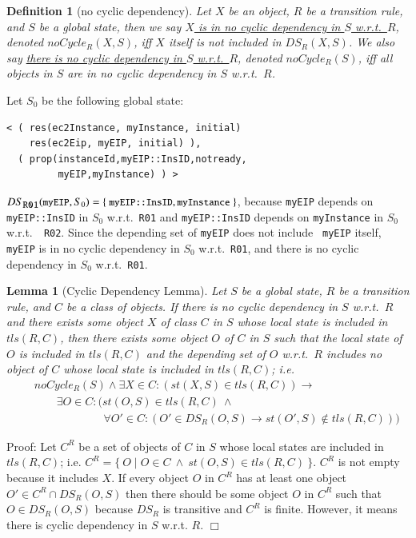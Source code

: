 \documentclass[12pt]{report}
\newtheorem{lemma}{Lemma}
\newtheorem{definition}{Definition}
\newcommand{\ra}{\rightarrow}
\newcommand{\mbstt}[1]{\mbox{\small{\tt {#1}}}}
\newcommand{\stt}[1]{{\small{\tt {#1}}}}
\newcommand{\ul}{\underline}
\begin{document}
\begin{definition}[no cyclic dependency]
Let $X$ be an object, $R$ be a transition rule, and $S$ be a global
state, then we say \ul{$X$ is in no cyclic dependency in $S$
  w.r.t.\ $R$}, denoted \ul{$noCycle_R(X,S)$}, iff $X$ itself is not
included in $DS_R(X,S)$.  We also say \ul{there is no cyclic
  dependency in $S$ w.r.t.\ $R$}, denoted \ul{$noCycle_R(S)$}, iff all
objects in $S$ are in no cyclic dependency in $S$ w.r.t.\ $R$.
\end{definition}
Let $S_0$ be the following global state:
\begin{verbatim}
< ( res(ec2Instance, myInstance, initial)
    res(ec2Eip, myEIP, initial) ),
  ( prop(instanceId,myEIP::InsID,notready,
         myEIP,myInstance) ) >
\end{verbatim}
$DS_{\mbstt{R01}}(\mbstt{myEIP},S_0) =
\{~\mbstt{myEIP::InsID},\mbstt{myInstance}~\}$, because {\tt myEIP}
depends on \stt{myEIP::InsID} in $S_0$ w.r.t.\ {\tt R01} and
\stt{myEIP::InsID} depends on {\tt myInstance} in $S_0$ w.r.t.\ {\tt
  R02}. Since the depending set of {\tt myEIP} does not include {\tt
  myEIP} itself, {\tt myEIP} is in no cyclic dependency in $S_0$
w.r.t.\ {\tt R01}, and there is no cyclic dependency in $S_0$
w.r.t.\ {\tt R01}.
\begin{lemma}[Cyclic Dependency Lemma]
Let $S$ be a global state, $R$ be a transition rule, and $C$ be a
class of objects. If there is no cyclic dependency in $S$ w.r.t.\ $R$
and there exists some object $X$ of class $C$ in $S$ whose local state
is included in $tls(R,C)$, then there exists some object $O$ of $C$ in
$S$ such that the local state of $O$ is included in $tls(R,C)$ and the
depending set of $O$ w.r.t.\ $R$ includes no object of $C$ whose local
state is included in $tls(R,C)$; i.e.
\begin{eqnarray*}
&&noCycle_R(S)\land\exists X\in C:(st(X,S)\in tls(R,C)) \ra\\
&&\:\:\:\:\:\:\:\:\:\exists O\in C:(st(O,S)\in tls(R,C)\ \land\\
&&\:\:\:\:\:\:\:\:\:\:\:\:\:\:\:\:\:\:\:\:\:\:\:\:\:\:\:\:
\forall O'\in C:(O'\in DS_R(O,S)\ra st(O',S)\not\in tls(R,C)))
\end{eqnarray*}
\end{lemma}
Proof: Let $C^R$ be a set of objects of $C$ in $S$ whose local states
are included in $tls(R,C)$; i.e. $C^R=\{~O\mid O\in C~\land~
st(O,S)\in tls(R,C)~\}$. $C^R$ is not empty because it includes $X$.
If every object $O$ in $C^R$ has at least one object $O' \in C^R\cap
DS_R(O,S)$ then there should be some object $O$ in $C^R$ such that $O
\in DS_R(O,S)$ because $DS_R$ is transitive and $C^R$ is
finite. However, it means there is cyclic dependency in $S$
w.r.t. $R$. $\Box$\\
\end{document}
